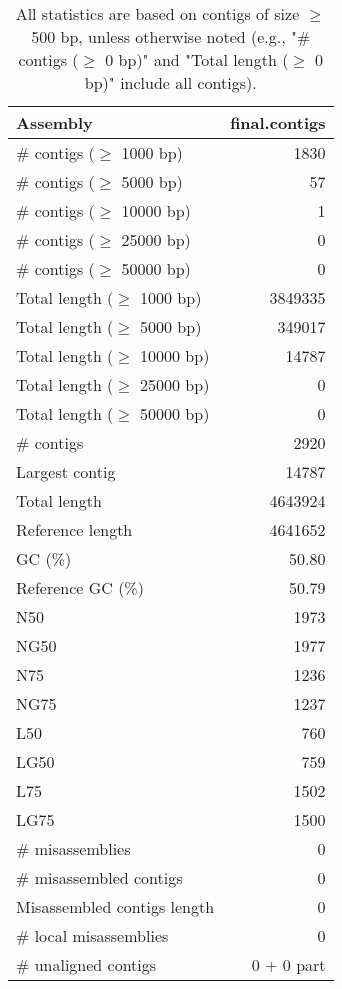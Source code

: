 \documentclass[12pt,a4paper]{article}
\begin{document}
\begin{table}[ht]
\begin{center}
\caption{All statistics are based on contigs of size $\geq$ 500 bp, unless otherwise noted (e.g., "\# contigs ($\geq$ 0 bp)" and "Total length ($\geq$ 0 bp)" include all contigs).}
\begin{tabular}{|l*{1}{|r}|}
\hline
Assembly & final.contigs \\ \hline
\# contigs ($\geq$ 1000 bp) & 1830 \\ \hline
\# contigs ($\geq$ 5000 bp) & 57 \\ \hline
\# contigs ($\geq$ 10000 bp) & 1 \\ \hline
\# contigs ($\geq$ 25000 bp) & 0 \\ \hline
\# contigs ($\geq$ 50000 bp) & 0 \\ \hline
Total length ($\geq$ 1000 bp) & 3849335 \\ \hline
Total length ($\geq$ 5000 bp) & 349017 \\ \hline
Total length ($\geq$ 10000 bp) & 14787 \\ \hline
Total length ($\geq$ 25000 bp) & 0 \\ \hline
Total length ($\geq$ 50000 bp) & 0 \\ \hline
\# contigs & 2920 \\ \hline
Largest contig & 14787 \\ \hline
Total length & 4643924 \\ \hline
Reference length & 4641652 \\ \hline
GC (\%) & 50.80 \\ \hline
Reference GC (\%) & 50.79 \\ \hline
N50 & 1973 \\ \hline
NG50 & 1977 \\ \hline
N75 & 1236 \\ \hline
NG75 & 1237 \\ \hline
L50 & 760 \\ \hline
LG50 & 759 \\ \hline
L75 & 1502 \\ \hline
LG75 & 1500 \\ \hline
\# misassemblies & 0 \\ \hline
\# misassembled contigs & 0 \\ \hline
Misassembled contigs length & 0 \\ \hline
\# local misassemblies & 0 \\ \hline
\# unaligned contigs & 0 + 0 part \\ \hline

\end{tabular}
\end{center}
\end{table}
\end{document}
